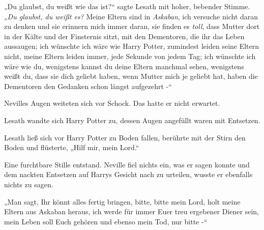 „Du glaubst, du weißt wie das ist?“ sagte Lesath mit hoher, bebender Stimme. „\emph{Du glaubst, du weißt es?} Meine Eltern sind in \emph{Askaban}, ich versuche nicht daran zu denken und sie erinnern mich immer daran, sie finden es \emph{toll}, dass Mutter dort in der Kälte und der Finsternis sitzt, mit den Dementoren, die ihr das Leben aussaugen; ich wünschte ich wäre wie Harry Potter, zumindest leiden seine Eltern nicht, meine Eltern leiden immer, jede Sekunde von jedem Tag; ich wünschte ich wäre wie du, wenigstens kannst du deine Eltern manchmal sehen, wenigstens weißt du, dass sie dich geliebt haben, wenn Mutter mich je geliebt hat, haben die Dementoren den Gedanken schon längst aufgezehrt -“

Nevilles Augen weiteten sich vor Schock. Das hatte er nicht erwartet.

Lesath wandte sich Harry Potter zu, dessen Augen angefüllt waren mit Entsetzen.

Lesath ließ sich vor Harry Potter zu Boden fallen, berührte mit der Stirn den Boden und flüsterte, „Hilf mir, mein Lord.“

Eine furchtbare Stille entstand. Neville fiel nichts ein, was er sagen konnte und dem nackten Entsetzen auf Harrys Gesicht nach zu urteilen, wusste er ebenfalls nichts zu sagen.

„Man sagt, Ihr könnt alles fertig bringen, bitte, bitte mein Lord, holt meine Eltern aus Askaban heraus, ich werde für immer Euer treu ergebener Diener sein, mein Leben soll Euch gehören und ebenso mein Tod, nur bitte -“

